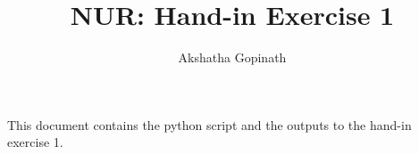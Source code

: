 \documentclass[a4paper,10pt]{article}
\title{NUR: Hand-in Exercise 1 }
\author{Akshatha Gopinath}
\begin{document}
\maketitle

This document contains the python script and the outputs to the hand-in exercise 1.






\end{document}
